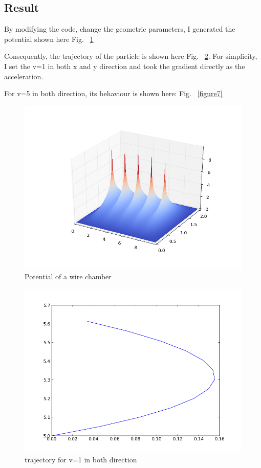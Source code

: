 \documentclass[11pt,letterpaper]{article}
\begin{document}
\subsection{Result}

By modifying the code, change the geometric parameters, I generated the potential shown here Fig. ~\ref{figure5}

Consequently, the trajectory of the particle is shown here Fig. ~\ref{figure6}. For simplicity, I set the v=1 in both x and y direction and took the gradient directly as the acceleration.

For v=5 in both direction, its behaviour is shown here: Fig. ~\ref{figure7}

\begin{figure}
\begin{center}
\includegraphics[width=0.8\linewidth,angle=0]{p3.png}
\caption{Potential of a wire chamber}
\label{figure5}
\end{center}
\end{figure}


\begin{figure}
\begin{center}
\includegraphics[width=0.8\linewidth,angle=0]{v11.png}
\caption{trajectory for v=1 in both direction}
\label{figure6}
\end{center}
\end{figure}
\end{document}
